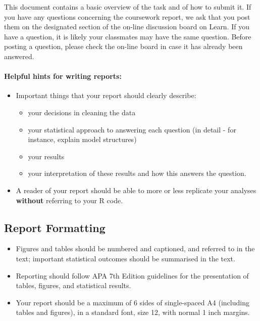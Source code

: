 \documentclass[
]{article}
\providecommand{\tightlist}{%
  \setlength{\itemsep}{0pt}\setlength{\parskip}{0pt}}
\begin{document}
This document contains a basic overview of the task and of how to submit
it. If you have any questions concerning the coursework report, we ask
that you post them on the designated section of the on-line discussion
board on Learn. If you have a question, it is likely your classmates may
have the same question. Before posting a question, please check the
on-line board in case it has already been answered.

\pagebreak

\hypertarget{helpful-hints-for-writing-reports}{%
\paragraph{Helpful hints for writing
reports:}\label{helpful-hints-for-writing-reports}}

\begin{itemize}
\tightlist
\item
  Important things that your report should clearly describe:

  \begin{itemize}
  \tightlist
  \item
    your decisions in cleaning the data
  \item
    your statistical approach to answering each question (in detail -
    for instance, explain model structures)
  \item
    your results
  \item
    your interpretation of these results and how this answers the
    question.
  \end{itemize}
\item
  A reader of your report should be able to more or less replicate your
  analyses \textbf{without} referring to your R code.
\end{itemize}

\hypertarget{report-formatting}{%
\subsection{Report Formatting}\label{report-formatting}}

\begin{itemize}
\tightlist
\item
  Figures and tables should be numbered and captioned, and referred to
  in the text; important statistical outcomes should be summarised in
  the text.
\item
  Reporting should follow APA 7th Edition guidelines for the
  presentation of tables, figures, and statistical results. 
\item
  Your report should be a maximum of 6 sides of single-spaced A4
  (including tables and figures), in a standard font, size 12, with
  normal 1 inch margins.
\end{itemize}
\end{document}
